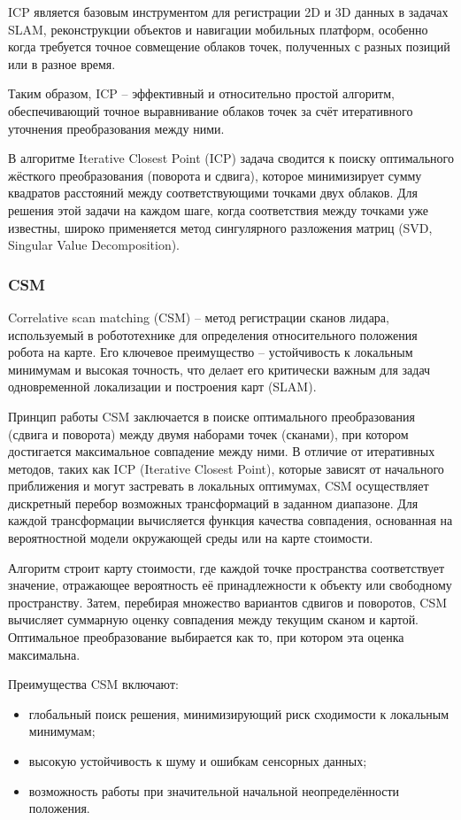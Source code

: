 {ICP является базовым инструментом для регистрации 2D и 3D данных в задачах SLAM,
реконструкции объектов и навигации мобильных платформ, особенно когда требуется
точное совмещение облаков точек, полученных с разных позиций или в разное время.

Таким образом, ICP -- эффективный и относительно простой алгоритм,
обеспечивающий точное выравнивание облаков точек за счёт итеративного уточнения
преобразования между ними.

В алгоритме Iterative Closest Point (ICP) задача сводится к поиску оптимального
жёсткого преобразования (поворота и сдвига), которое минимизирует сумму
квадратов расстояний между соответствующими точками двух облаков. Для решения
этой задачи на каждом шаге, когда соответствия между точками уже известны,
широко применяется метод сингулярного разложения матриц (SVD, Singular Value
Decomposition).

\subsubsection{CSM}
Correlative scan matching (CSM) -- метод регистрации сканов лидара, используемый
в робототехнике для определения относительного положения робота на карте. Его
ключевое преимущество -- устойчивость к локальным минимумам и высокая точность, что делает его критически важным для задач одновременной локализации и построения карт (SLAM).

Принцип работы CSM заключается в поиске оптимального преобразования (сдвига и поворота) между двумя наборами точек (сканами), при котором достигается максимальное совпадение между ними. В отличие от итеративных методов, таких как ICP (Iterative Closest Point), которые зависят от начального приближения и могут застревать в локальных оптимумах, CSM осуществляет дискретный перебор возможных трансформаций в заданном диапазоне. Для каждой трансформации вычисляется функция качества совпадения, основанная на вероятностной модели окружающей среды или на карте стоимости.

Алгоритм строит карту стоимости, где каждой точке пространства соответствует значение, отражающее вероятность её принадлежности к объекту или свободному пространству. Затем, перебирая множество вариантов сдвигов и поворотов, CSM вычисляет суммарную оценку совпадения между текущим сканом и картой. Оптимальное преобразование выбирается как то, при котором эта оценка максимальна.

Преимущества CSM включают:
\begin{itemize}
	\item глобальный поиск решения, минимизирующий риск сходимости к локальным минимумам;
	\item высокую устойчивость к шуму и ошибкам сенсорных данных;
	\item возможность работы при значительной начальной неопределённости положения.
\end{itemize}

}
